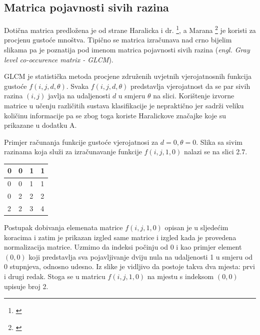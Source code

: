 \documentclass[times, utf8, zavrsni]{fer}
\begin{document}
\newpage

\subsection{Matrica pojavnosti sivih razina}

Dotična matrica predložena je od strane Haralicka i dr. \footnote{\cite{haralick}}, 
a Marana \footnote{\cite{marana}} je koristi za procjenu gustoće mnoštva.
Tipično se matrica izračunava nad crno bijelim slikama pa je poznatija
pod imenom matrica pojavnosti sivih razina (\textit{engl. Gray level co-occurence matrix - GLCM}).

\bigbreak

GLCM je statistička metoda procjene združenih uvjetnih vjerojatnosnih funkcija
gustoće \(f(i,j,d,\theta)\). Svaka \(f(i,j,d,\theta)\) predstavlja vjerojatnost 
da se par sivih razina \((i,j)\) javlja na udaljenosti \(d\) u smjeru \(\theta\)
na slici. Korištenje izvorne matrice u učenju različitih sustava klasifikacije 
je nepraktično jer sadrži veliku količinu informacije pa se zbog toga koriste
Haralickove značajke koje su prikazane u dodatku A.

\bigbreak

Primjer računanja funkcije gustoće vjerojatnosi za \(d=0, \theta=0\). Slika 
sa sivim razinama koja služi za izračunavanje funkcije \(f(i,j,1,0)\) nalazi 
se na slici 2.7.

\bigbreak
\bigbreak

\begin{minipage}{\linewidth}
\centering
\begin{tabularx}{0.3\textwidth}{| X | X | X | X |}
\hline
0 & 0 & 1 & 1 \\ 
\hline
0 & 0 & 1 & 1 \\ 
\hline
0 & 2 & 2 & 2 \\
\hline
2 & 2 & 3 & 4 \\
\hline
\end{tabularx}
\end{minipage}

\bigbreak

Postupak dobivanja elemenata matrice \(f(i,j,1,0)\) opisan je u sljedećim koracima i zatim
je prikazan izgled same matrice i izgled kada je provedena normalizacija matrice. 
Uzmimo da indeksi počinju od 0 i kao primjer
element \((0,0)\) koji predstavlja sva pojavljivanje dviju nula na udaljenosti 1
u smjeru od 0 stupnjeva, odnosno udesno. Iz slike je vidljivo da postoje takva
dva mjesta: prvi i drugi redak. Stoga se u matricu \(f(i,j,1,0)\) na mjestu
s indeksom \((0,0)\) upisuje broj 2. 
\end{document}
